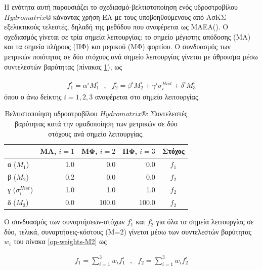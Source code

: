 Η ενότητα αυτή παρουσιάζει το σχεδιασμό-βελτιστοποίηση ενός υδροστροβίλου $Hydromatrix\circledR$ κάνοντας χρήση ΕΑ με τους υποβοηθούμενους από ΑσΚΣ εξελικτικούς τελεστές, δηλαδή της μεθόδου που αναφέρεται ως ΜΑΕΑ(). Ο σχεδιασμός γίνεται σε τρία σημεία λειτουργίας: το σημείο μέγιστης απόδοσης (ΜΑ) και τα σημεία πλήρους (ΠΦ) και μερικού (ΜΦ) φορτίου. Ο συνδυασμός των μετρικών ποιότητας σε δύο  στόχους ανά σημείο λειτουργίας γίνεται με άθροισμα μέσω συντελεστών βαρύτητας (πίνακας \ref{op-weights-M1}), ως


\begin{eqnarray}
   f_1^i=\alpha ^i  M_1^i ~~~,~~~ f_2^i=\beta ^i Μ_2^i+\gamma ^i  \sigma_i^{Hist} +\delta ^i  Μ_3^i 
   \label{ObjFrancis} 
\end{eqnarray}
όπου ο άνω δείκτης $i=1,2,3$ αναφέρεται στο σημείο λειτουργίας.


\begin{table}[h!]
\begin{center}
\begin{tabular}{ |l|r|r|r|c| }
\hline
& ΜΑ, $i\!=\!1$ & ΜΦ, $i\!=\!2$ & ΠΦ, $i\!=\!3$ &  Στόχος\\
\hline
α ($M_1$) & 1.0            &0.0            &0.0 & $f_1$\\
\hline
β ($M_2$) &0.2    &0.0            &0.0  & $f_2$\\
\hline
γ ($\sigma_i^{Hist}$) &1.0            &1.0            &1.0 & $f_2$\\
\hline
δ ($M_3$) &0.0            &100.0  &100.0 & $f_2$\\
\hline
\end{tabular}
\caption{Βελτιστοποίηση υδροστροβίλου $Hydromatrix\circledR$: Συντελεστές βαρύτητας κατά την ομαδοποίηση των μετρικών σε δύο στόχους ανά σημείο λειτουργίας.}
\label{op-weights-M1}
\end{center}
\end{table}

 Ο συνδυασμός των συναρτήσεων-στόχων $f^i_1$ και $f^i_2$ για όλα τα σημεία λειτουργίας σε δύο, τελικά, συναρτήσεις-κόστους (M=$2$) γίνεται μέσω των συντελεστών βαρύτητας $w_i$ του πίνακα \ref{op-weights-M2} ως

\begin{eqnarray}
   f_1=\sum^3_{i=1}w_if_1^i ~~~,~~~ f_2=\sum^3_{i=1}w_if_2^i 
   \label{ObjFrancis2} 
\end{eqnarray}

